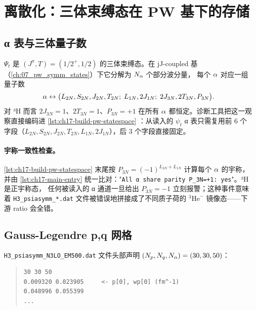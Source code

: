 \section{离散化：三体束缚态在 PW 基下的存储}
\label{sec:ch17-discretization}

\subsection{α 表与三体量子数}
\label{subsec:ch17-alpha-table}

\(\Psi_t\) 是 \((J^\pi, T) = (1/2^+, 1/2)\) 的三体束缚态。在 jJ-coupled
基（\cref{ch:07_pw_symm_states}）下它分解为 \(N_\alpha\) 个部分波分量，
每个 \(\alpha\) 对应一组量子数
\begin{equation}
\label{eq:ch17-alpha-tuple}
\alpha \leftrightarrow \bigl(L_{2N}, S_{2N}, J_{2N}, T_{2N};\; L_{1N}, 2J_{1N};\;
                              2J_{3N}, 2T_{3N}, P_{3N}\bigr).
\end{equation}
对 ³H 而言 \(2J_{3N} = 1\)、\(2T_{3N} = 1\)、\(P_{3N} = +1\) 在所有 \(\alpha\)
都恒定。诊断工具把这一观察直接编码进 \cref{lst:ch17-build-pw-statespace}
：从读入的 \(\psi_t\) α 表只需复用前 6 个字段（\(L_{2N}, S_{2N}, J_{2N},
T_{2N}, L_{1N}, 2J_{1N}\)），后 3 个字段直接固定。

\paragraph{宇称一致性检查。}
\cref{lst:ch17-build-pw-statespace} 末尾按 \(P_{3N} = (-1)^{L_{2N} + L_{1N}}\)
计算每个 \(\alpha\) 的宇称，并由 \cref{lst:ch17-main-entry}
统一比对："\texttt{All α share parity P\_3N=+1: yes}"。³H 是正宇称态，
任何被读入的 α 通道一旦给出 \(P_{3N} = -1\) 立刻报警；这种事件意味着
\texttt{H3\_psiasymm\_*.dat} 文件被错误地拼接成了不同质子荷的 \({}^3\!\mathrm{He}^-\)
镜像态——下游 ratio 会全错。

\subsection{Gauss-Legendre p,q 网格}
\label{subsec:ch17-pq-grid}

\texttt{H3\_psiasymm\_N3LO\_EM500.dat} 文件头部声明 \((N_p, N_q, N_\alpha) = (30, 30, 50)\)：

\begin{quote}
\small
\begin{verbatim}
30 30 50
0.009320 0.023905     <- p[0], wp[0] (fm^-1)
0.048996 0.055399
...
\end{verbatim}
\end{quote}

